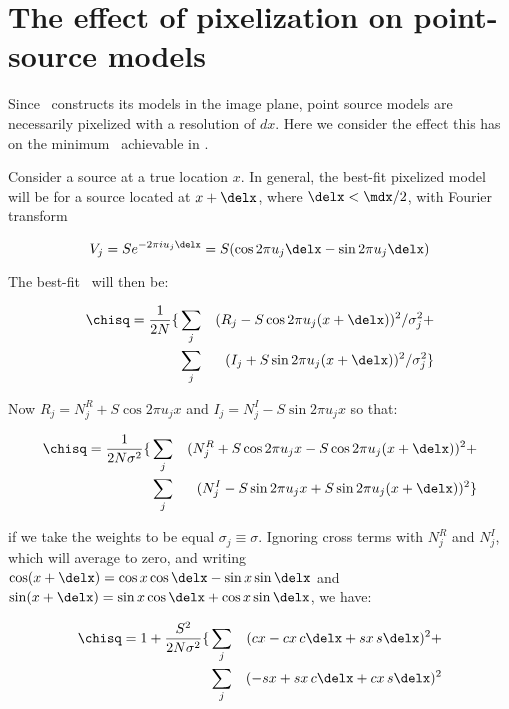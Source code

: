 \section{The effect of pixelization on point-source models}

Since \climax\ constructs its models in the image plane, point source
models are necessarily pixelized with a resolution of $dx$.  Here we
consider the effect this has on the minimum \math{\chisq}\ achievable in
\climax.

Consider a source at a true location $x$.  In general, the best-fit
pixelized model will be for a source located at $x + \delx$, where
$\delx < \mdx/2$, with Fourier transform 

\begin{equation}
V_j = Se^{-2\pi i u_j\delx} = S(\cos{2\pi u_j\delx} - \sin{2\pi u_j\delx})
\end{equation}

The best-fit \math{\chisq}\ will then be:

\begin{eqnarray}\nonumber
  \chisq = {1\over{2N}}\{&\sum_j&{(R_j - S\cos{2\pi u_j(x + \delx)})^2/\sigma_j^2} + \\\nonumber
                         &\sum_j&{(I_j + S\sin{2\pi u_j(x + \delx)})^2/\sigma_j^2}\} 
\end{eqnarray}

Now $R_j = N^R_j + S\cos{2\pi u_j x}$ and $I_j = N^I_j - S\sin{2\pi u_j x}$ so that:

\begin{eqnarray}\nonumber
  \chisq = {1\over{2N\sigma^2}}\{&\sum_j&{(N^R_j + S\cos{2\pi u_j x} - S\cos{2\pi u_j(x + \delx)})^2} + \\\nonumber
                                 &\sum_j&{(N^I_j - S\sin{2\pi u_j x} + S\sin{2\pi u_j(x + \delx)})^2}\} 
\end{eqnarray}

if we take the weights to be equal $\sigma_j \equiv \sigma$.  Ignoring
cross terms with $N^R_j$ and $N^I_j$, which will average to zero, and
writing $\cos(x + \delx) = \cos{x}\cos{\delx} - \sin{x}\sin{\delx}$ and 
$\sin(x + \delx) = \sin{x}\cos{\delx} + \cos{x}\sin{\delx}$, we have:

\begin{eqnarray}\nonumber
  \chisq = 1 + {S^2\over{2N\sigma^2}}\{&\sum_j&{( cx - cx\,c\delx + sx\,s\delx})^2 + \\\nonumber
                                     &\sum_j&{(-sx + sx\,c\delx + cx\,s\delx)^2}
\end{eqnarray}

